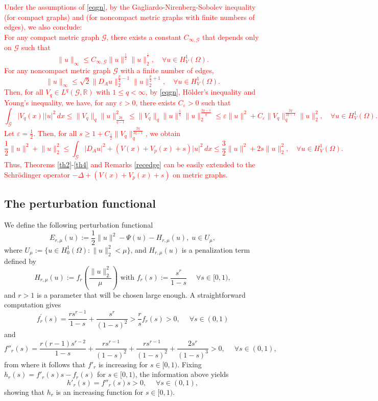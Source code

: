 \documentclass[11pt]{amsart}
\newcommand{\abs}[1]{\lvert#1\rvert}
\newcommand{\norm}[1]{\lVert#1\rVert}
\newcommand{\red}[1]{\textcolor{red}{#1}}
\newcommand{\G}{\mathcal{G}}
\newcommand{\R}{\mathbb{R}}
\numberwithin{equation}{section}
\begin{document}
\red{Under the assumptions of \eqref{eqgn}, by the Gagliardo-Nirenberg-Sobolev inequality \cite[Theorem 1.1]{Ha2} (for compact graphs) and \cite[Section 2]{Adami} (for noncompact metric graphs with finite numbers of edges), we also conclude:\\
    For any compact metric graph $\G$, there exists a constant $C_{\infty,\G}$ that depends only on $\G$ such that
\[
    \norm{u}_\infty\leq C_{\infty,\G} \norm{u}^\frac{1}{2}\norm{u}_2^{^\frac{1}{2}}, \quad \forall u \in H^1_V(\Omega).
\]
For any noncompact metric graph $\G$ with a finite number of edges,
\[
 \norm{u}_\infty \leq \sqrt{2}  \norm{D_Au}^{\frac{p}{2}-1}_2\norm{u}_2^{\frac{p}{2}+1}, \quad \forall  u \in H^1_V(\Omega).
\]
Then, for all $V_q \in L^q(\G,\R)$ with $1\leq q < \infty$, by \eqref{eqgn}, H\"older's inequality and Young's inequality, we have, for any $\varepsilon>0$, there exists $C_\varepsilon>0$ such that
$$
\int_{\G} \abs{V_q(x)}\abs{u}^2\,dx \leq \norm{V_q}_q\norm{u}^2_{\frac{2q}{q-1}}\leq \norm{V_q}_q\norm{u}^\frac{1}{q}\norm{u}_2^\frac{2q-1}{q}\leq \varepsilon\norm{u}^2 +C_\varepsilon\norm{V_q}_q^{\frac{2q}{2q-1}}\norm{u}_2^2, \quad \forall  u \in H^1_V(\Omega).
$$
Let $\varepsilon=\frac{1}{2}$. Then, for all $s\geq 1 + C_\frac{1}{2}\norm{V_q}_q^{\frac{2q}{2q-1}}$, we obtain
$$
\frac{1}{2}\norm{u}^2 + \norm{u}_2^2 \leq \int_\G \abs{D_Au}^2+  \left(V(x) +V_p(x)+s\right)\abs{u}^2\,dx \leq \frac{3}{2}\norm{u}^2 + 2s  \norm{u}_2^2, \quad \forall  u \in H^1_V(\Omega).
$$
Thus, Theorems \ref{th2}-\ref{th4} and Remarks \ref{recedge} can be easily extended to the Schr\"odinger operator $-\Delta  +\left(V(x) +V_p(x)+s\right)$ on metric graphs.}
\fi
\subsection{The perturbation functional}\label{subsecpf}
We define the following perturbation functional
$$
E_{r, \mu}(u) := \frac{1}{2}\norm{u}^{2}-\Psi(u)-H_{r,\mu}(u),\; u \in U_{\mu},
$$
where $U_{\mu} := \{u \in H_0^1(\Omega): \norm{u}_2^2<\mu\}$, and $H_{r, \mu}(u)$ is a penalization term defined by
$$
H_{r, \mu}(u) := f_{r}\left(\frac{\norm{u}_2^2}{\mu}\right) \text { with } f_{r}(s) := \frac{s^{r}}{1-s} \; \quad \forall s \in [0,1),
$$
and $r>1$ is a parameter that will be chosen large enough. A straightforward computation gives
\begin{equation}\label{eqfr's}
    f_{r}^{\prime}(s)=\frac{r s^{r-1}}{1-s}+\frac{s^{r}}{(1-s)^{2}}>\frac{r}{s} f_{r}(s)>0, \; \quad \forall s \in (0,1)
\end{equation}
and
\begin{equation} \label{eqfr''s}
	f''_r(s)=\frac{r(r-1)s^{r-2}}{1-s}+\frac{rs^{r-1}}{(1-s)^2}+\frac{rs^{r-1}}{(1-s)^2}+\frac{2s^{r}}{(1-s)^3}>0,\; \quad \forall s \in (0,1),
\end{equation}
from where it follows that $f'_r$ is increasing for $s \in [0,1)$. Fixing $h_r(s)=f'_r(s)s-f_r(s)$ for $s \in [0,1)$, the information above yields
\begin{equation} \label{eqhrs}
	h'_r(s)=f''_r(s)s>0, \; \quad \forall s \in (0,1),
\end{equation}
showing that $h_r$ is an increasing function for $s \in [0,1)$.
\end{document}
